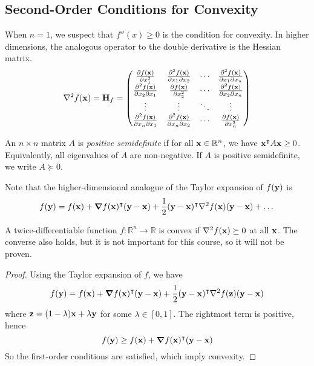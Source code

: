 \subsection{Second-Order Conditions for Convexity}
When \(n = 1\), we suspect that \(f''(x) \geq 0\) is the condition for convexity.
In higher dimensions, the analogous operator to the double derivative is the Hessian matrix.
\[
	\laplacian{f(\vb x)} = \vb H_f = \begin{pmatrix}
		\pdv{f(\vb x)}{x_1^2}    & \pdv{f(\vb x)}{x_1}{x_2} & \cdots & \pdv{f(\vb x)}{x_1}{x_n} \\
		\pdv{f(\vb x)}{x_2}{x_1} & \pdv{f(\vb x)}{x_2^2}    & \cdots & \pdv{f(\vb x)}{x_2}{x_n} \\
		\vdots                   & \vdots                   & \ddots & \vdots                   \\
		\pdv{f(\vb x)}{x_n}{x_1} & \pdv{f(\vb x)}{x_n}{x_2} & \cdots & \pdv{f(\vb x)}{x_n^2}    \\
	\end{pmatrix}
\]
\begin{definition}
	An \(n \times n\) matrix \(A\) is \textit{positive semidefinite} if for all \(\vb x \in \mathbb R^n\), we have \(\vb x^\intercal A \vb x \geq 0\).
	Equivalently, all eigenvalues of \(A\) are non-negative.
	If \(A\) is positive semidefinite, we write \(A \succeq 0\).
\end{definition}
Note that the higher-dimensional analogue of the Taylor expansion of \(f(\vb y)\) is
\[
	f(\vb y) = f(\vb x) + \grad{f(\vb x)}^\transpose (\vb y - \vb x) + \frac{1}{2}(\vb y - \vb x)^\transpose \laplacian{f(\vb x)} (\vb y - \vb x) + \dots
\]
\begin{theorem}
	A twice-differentiable function \(f \colon \mathbb R^n \to \mathbb R\) is convex if \(\laplacian{f(\vb x)} \succeq 0\) at all \(\vb x\).
	The converse also holds, but it is not important for this course, so it will not be proven.
\end{theorem}
\begin{proof}
	Using the Taylor expansion of \(f\), we have
	\[
		f(\vb y) = f(\vb x) + \grad{f(\vb x)}^\transpose (\vb y - \vb x) + \frac{1}{2}(\vb y - \vb x)^\transpose \laplacian{f(\vb z)} (\vb y - \vb x)
	\]
	where \(\vb z = (1-\lambda)\vb x + \lambda \vb y\) for some \(\lambda \in [0, 1]\).
	The rightmost term is positive, hence
	\[
		f(\vb y) \geq f(\vb x) + \grad{f(\vb x)}^\intercal (\vb y - \vb x)
	\]
	So the first-order conditions are satisfied, which imply convexity.
\end{proof}
